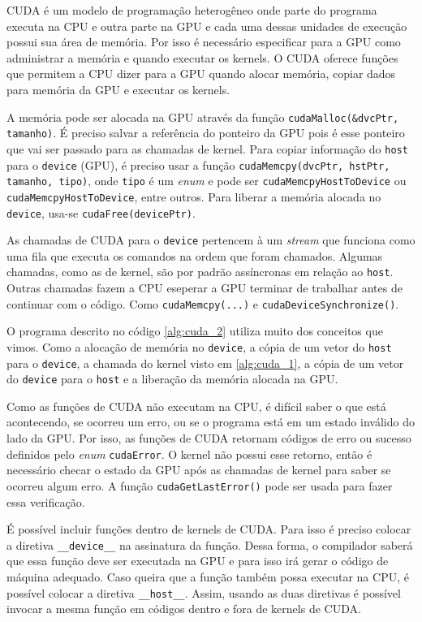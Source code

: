 
CUDA é um modelo de programação heterogêneo onde parte do programa executa na CPU e outra parte na GPU e cada uma dessas unidades de execução possui sua área de memória.
Por isso é necessário especificar para a GPU como administrar a memória e quando executar os kernels. O CUDA oferece funções que permitem a CPU dizer para a GPU quando alocar memória, copiar dados para memória da GPU e executar os kernels.

A memória pode ser alocada na GPU através da função \texttt{cudaMalloc(\&dvcPtr, tamanho)}. É preciso salvar a referência do ponteiro da GPU pois é esse ponteiro que vai ser passado para as chamadas de kernel. Para copiar informação do \texttt{host} para o \texttt{device} (GPU), é preciso usar a função \texttt{cudaMemcpy(dvcPtr, hstPtr, tamanho,  tipo)}, onde \texttt{tipo} é um {\em enum} e pode ser \texttt{cudaMemcpyHostToDevice} ou \texttt{cudaMemcpyHostToDevice}, entre outros. Para liberar a memória alocada no \texttt{device}, usa-se \texttt{cudaFree(devicePtr)}. 

As chamadas de CUDA para o \texttt{device} pertencem à um {\em stream} que funciona como uma fila que executa os comandos na ordem que foram chamados. Algumas chamadas, como as de kernel, são por padrão assíncronas em relação ao \texttt{host}. Outras chamadas fazem a CPU eseperar a GPU terminar de trabalhar antes de continuar com o código. Como \texttt{cudaMemcpy(...)} e \texttt{cudaDeviceSynchronize()}.

O programa descrito no código \ref{alg:cuda_2} utiliza muito dos conceitos que vimos. Como a alocação de memória no \texttt{device}, a cópia de um vetor do \texttt{host} para o \texttt{device}, a chamada do kernel visto em \ref{alg:cuda_1}, a cópia de um vetor do \texttt{device} para o \texttt{host} e a liberação da memória alocada na GPU.


Como as funções de CUDA não executam na CPU, é difícil saber o que está acontecendo, se ocorreu um erro, ou se o programa está em um estado inválido do lado da GPU. Por isso, as funções de CUDA retornam códigos de erro ou sucesso definidos pelo {\em enum }\texttt{cudaError}. O kernel não possui esse retorno, então é necessário checar o estado da GPU após as chamadas de kernel para saber se ocorreu algum erro.  A função \texttt{cudaGetLastError()} pode ser usada para fazer essa verificação.

É possível incluir funções dentro de kernels de CUDA. Para isso é preciso colocar a diretiva \texttt{\_\_device\_\_} na assinatura da função. Dessa forma, o compilador saberá que essa função deve ser executada na GPU e para isso irá gerar o código de máquina adequado. Caso queira que a função também possa executar na CPU, é possível colocar a diretiva \texttt{\_\_host\_\_}. Assim, usando as duas diretivas é possível invocar a mesma função em códigos dentro e fora de kernels de CUDA.
